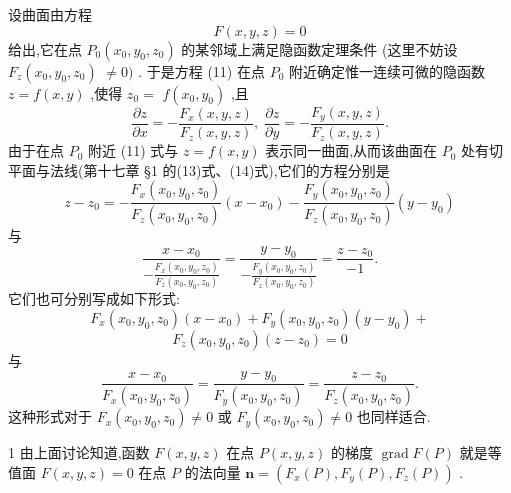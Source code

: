 设曲面由方程
\[
F\left( {x,y,z}\right)  = 0 \tag{11}
\]
给出,它在点 \({P}_{0}\left( {{x}_{0},{y}_{0},{z}_{0}}\right)\) 的某邻域上满足隐函数定理条件 (这里不妨设 \({F}_{z}\left( {{x}_{0},{y}_{0},{z}_{0}}\right)\)  \(\neq  0)\) . 于是方程 (11) 在点 \({P}_{0}\) 附近确定惟一连续可微的隐函数 \(z = f\left( {x,y}\right)\) ,使得 \({z}_{0} =\)  \(f\left( {{x}_{0},{y}_{0}}\right)\) ,且
\[
\frac{\partial z}{\partial x} =  - \frac{{F}_{x}\left( {x,y,z}\right) }{{F}_{z}\left( {x,y,z}\right) },\;\frac{\partial z}{\partial y} =  - \frac{{F}_{y}\left( {x,y,z}\right) }{{F}_{z}\left( {x,y,z}\right) }.
\]
由于在点 \({P}_{0}\) 附近 (11) 式与 \(z = f\left( {x,y}\right)\) 表示同一曲面,从而该曲面在 \({P}_{0}\) 处有切平面与法线(第十七章 §1 的(13)式、(14)式),它们的方程分别是
\[
z - {z}_{0} =  - \frac{{F}_{x}\left( {{x}_{0},{y}_{0},{z}_{0}}\right) }{{F}_{z}\left( {{x}_{0},{y}_{0},{z}_{0}}\right) }\left( {x - {x}_{0}}\right)  - \frac{{F}_{y}\left( {{x}_{0},{y}_{0},{z}_{0}}\right) }{{F}_{z}\left( {{x}_{0},{y}_{0},{z}_{0}}\right) }\left( {y - {y}_{0}}\right)
\]
与
\[
\frac{x - {x}_{0}}{-\frac{{F}_{x}\left( {{x}_{0},{y}_{0},{z}_{0}}\right) }{{F}_{z}\left( {{x}_{0},{y}_{0},{z}_{0}}\right) }} = \frac{y - {y}_{0}}{-\frac{{F}_{y}\left( {{x}_{0},{y}_{0},{z}_{0}}\right) }{{F}_{z}\left( {{x}_{0},{y}_{0},{z}_{0}}\right) }} = \frac{z - {z}_{0}}{-1}.
\]
它们也可分别写成如下形式:
\[
{F}_{x}\left( {{x}_{0},{y}_{0},{z}_{0}}\right) \left( {x - {x}_{0}}\right)  + {F}_{y}\left( {{x}_{0},{y}_{0},{z}_{0}}\right) \left( {y - {y}_{0}}\right)  +
\]
\[
{F}_{z}\left( {{x}_{0},{y}_{0},{z}_{0}}\right) \left( {z - {z}_{0}}\right)  = 0 \tag{12}
\]
与
\[
\frac{x - {x}_{0}}{{F}_{x}\left( {{x}_{0},{y}_{0},{z}_{0}}\right) } = \frac{y - {y}_{0}}{{F}_{y}\left( {{x}_{0},{y}_{0},{z}_{0}}\right) } = \frac{z - {z}_{0}}{{F}_{z}\left( {{x}_{0},{y}_{0},{z}_{0}}\right) }. \tag{13}
\]
这种形式对于 \({F}_{x}\left( {{x}_{0},{y}_{0},{z}_{0}}\right)  \neq  0\) 或 \({F}_{y}\left( {{x}_{0},{y}_{0},{z}_{0}}\right)  \neq  0\) 也同样适合.

\begin{remark}

\end{remark}
1 由上面讨论知道,函数 \(F\left( {x,y,z}\right)\) 在点 \(P\left( {x,y,z}\right)\) 的梯度 \(\operatorname{grad}F\left( P\right)\) 就是等值面 \(F\left( {x,y,z}\right)  = 0\) 在点 \(P\) 的法向量 \(\mathbf{n} = \left( {{F}_{x}\left( P\right) ,{F}_{y}\left( P\right) ,{F}_{z}\left( P\right) }\right)\) .

